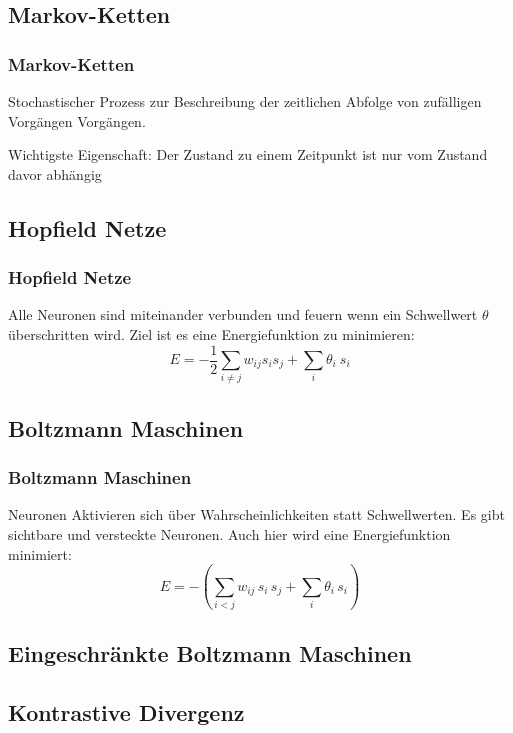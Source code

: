 \documentclass[12pt,titlepage]{beamer}
\begin{document}
	\subsection{Markov-Ketten}
	\begin{frame}
	\frametitle{Markov-Ketten}
	Stochastischer Prozess zur Beschreibung der zeitlichen Abfolge von zufälligen Vorgängen Vorgängen. 	
	
	Wichtigste Eigenschaft: Der Zustand zu einem Zeitpunkt ist nur vom Zustand davor abhängig
		\end{frame}
	\subsection{Hopfield Netze}
	\begin{frame}
	\frametitle{Hopfield Netze}
	\begin{figure}[H]
	\center
	
	\label{HopfieldNetz}
	\end{figure}
	Alle Neuronen sind miteinander verbunden und feuern wenn ein Schwellwert $\theta$ überschritten wird. Ziel ist es eine Energiefunktion zu minimieren:
	$$
	E = -\frac{1}{2}\sum_{i\neq j}{w_{ij}{s_i}{s_j}}+\sum_i{\theta_i\ s_i}
	$$
	\end{frame}
	\subsection{Boltzmann Maschinen}
	
	\begin{frame}
	\frametitle{Boltzmann Maschinen}
	\begin{figure}[H]
	\center
	
	\label{Boltzmannmaschine}
	\end{figure}
	Neuronen Aktivieren sich über Wahrscheinlichkeiten statt Schwellwerten. Es gibt sichtbare und versteckte Neuronen.
	Auch hier wird eine Energiefunktion minimiert:
	$$
	E = -\left(\sum_{i<j} w_{ij} \, s_i \, s_j + \sum_i \theta_i \, s_i \right)$$
	\end{frame}
	\subsection{Eingeschränkte Boltzmann Maschinen}
	\begin{frame}
	\end{frame}
	\subsection{Kontrastive Divergenz}
	\begin{frame}
	\end{frame}
\end{document}
